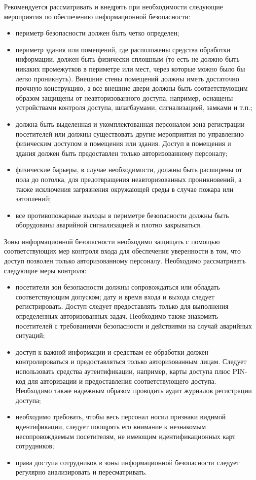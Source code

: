 \documentclass[12pt, russian, oneside, article]{ncc}
\begin{document}
Рекомендуется рассматривать и внедрять при необходимости следующие мероприятия по обеспечению информационной безопасности:
\begin{itemize}
\item периметр безопасности должен быть четко определен;
\item периметр здания или помещений, где расположены средства обработки информации, должен быть физически сплошным (то есть не должно быть никаких промежутков в периметре или мест, через которые можно было бы легко проникнуть). Внешние стены помещений должны иметь достаточно прочную конструкцию, а все внешние двери должны быть соответствующим образом защищены от неавторизованного доступа, например, оснащены устройствами контроля доступа, шлагбаумами, сигнализацией, замками и т.п.;
\item должна быть выделенная и укомплектованная персоналом зона регистрации посетителей или должны существовать другие мероприятия по управлению физическим доступом в помещения или здания. Доступ в помещения и здания должен быть предоставлен только авторизованному персоналу;
\item физические барьеры, в случае необходимости, должны быть расширены от пола до потолка, для предотвращения неавторизованных проникновений, а также исключения загрязнения окружающей среды в случае пожара или затоплений;
\item все противопожарные выходы в периметре безопасности должны быть оборудованы аварийной сигнализацией и плотно закрываться.
\end{itemize}

Зоны информационной безопасности необходимо защищать с помощью соответствующих мер контроля входа для обеспечения уверенности в том, что доступ позволен только авторизованному персоналу. Необходимо рассматривать следующие меры контроля:
\begin{itemize}
\item посетители зон безопасности должны сопровождаться или обладать соответствующим допуском; дату и время входа и выхода следует регистрировать. Доступ следует предоставлять только для выполнения определенных авторизованных задач. Необходимо также знакомить посетителей с требованиями безопасности и действиями на случай аварийных ситуаций;
\item доступ к важной информации и средствам ее обработки должен контролироваться и предоставляться только авторизованным лицам. Следует использовать средства аутентификации, например, карты доступа плюс PIN-код для авторизации и предоставления соответствующего доступа. Необходимо также надежным образом проводить аудит журналов регистрации доступа;
\item необходимо требовать, чтобы весь персонал носил признаки видимой идентификации, следует поощрять его внимание к незнакомым несопровождаемым посетителям, не имеющим идентификационных карт сотрудников;
\item права доступа сотрудников в зоны информационной безопасности следует регулярно анализировать и пересматривать.
\end{itemize}
\end{document}
